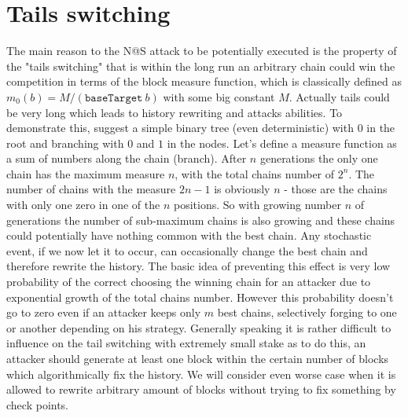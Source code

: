 \documentclass[12pt]{article}
\begin{document}
\section{Tails switching}

The main reason to the N@S attack to be potentially executed is the property of the "tails switching" that is within the long run an arbitrary 
chain could win the competition in terms of the block measure function, which is classically defined as $m_0(b) = M/(\texttt{baseTarget}\ b)$ with 
some big constant $M$. Actually tails could be very long which leads to history rewriting and attacks abilities. To demonstrate this, suggest 
a simple binary tree (even deterministic) with $0$ in the root and branching with $0$ and $1$ in the nodes. Let's define a measure
function as a sum of numbers along the chain (branch). After $n$ generations the only one chain has the maximum measure $n$, with the total chains 
number of  $2^n$. The number of chains with the measure $2n-1$ is obviously $n$ \-- those are the chains with only one zero in one of 
the $n$ positions. So with growing number $n$ of generations the number of sub-maximum chains is also growing and these chains could potentially 
have nothing common with the best chain. Any stochastic event, if we now let it to occur, can occasionally change the best chain and therefore 
rewrite the history. The basic idea of preventing this effect is very low probability of the correct choosing the winning chain for an attacker 
due to exponential growth of the total chains number. However this probability doesn't go to zero even if an attacker keeps only $m$ best 
chains, selectively forging to one or another depending on his strategy. Generally speaking it is rather difficult to influence on the 
tail switching with extremely small stake as to do this, an attacker should generate at least one block within the certain number of blocks 
which algorithmically fix the history. We will consider even worse case when it is allowed to rewrite arbitrary amount of blocks without 
trying to fix something by check points. 
\end{document}
